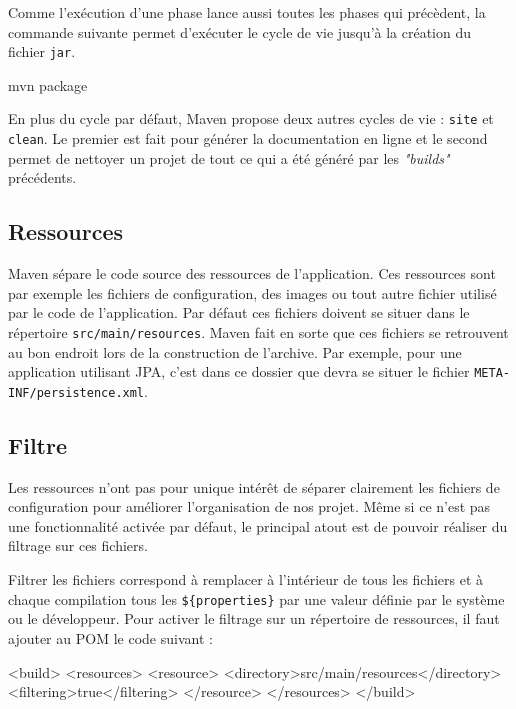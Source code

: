 \documentclass[a4paper,11pt]{article}
\begin{document}
Comme l'exécution d'une phase lance aussi toutes les phases qui précèdent, la commande suivante permet d'exécuter le cycle 
de vie jusqu'à la création du fichier \texttt{jar}.
\begin{code_shell}
mvn package
\end{code_shell}

En plus du cycle par défaut, Maven propose deux autres cycles de vie : \texttt{site} et \texttt{clean}. Le premier est 
fait pour générer la documentation en ligne et le second permet de nettoyer un projet de tout ce qui a été généré par les 
\emph{"builds"} précédents.

\subsection{Ressources}
Maven sépare le code source des ressources de l'application. Ces ressources sont par exemple les fichiers de configuration, 
des images ou tout autre fichier utilisé par le code de l'application. Par défaut ces fichiers doivent se situer dans le 
répertoire \texttt{src/main/resources}. Maven fait en sorte que ces fichiers se retrouvent au bon endroit lors de la 
construction de l'archive. Par exemple, pour une application utilisant JPA, c'est dans ce dossier que devra se situer 
le fichier \texttt{META-INF/persistence.xml}.

\subsection{Filtre}
Les ressources n'ont pas pour unique intérêt de séparer clairement les fichiers de configuration pour améliorer 
l'organisation de nos projet. Même si ce n'est pas une fonctionnalité activée par défaut, le principal atout est 
de pouvoir réaliser du filtrage sur ces fichiers. 

Filtrer les fichiers correspond à remplacer à l'intérieur de tous les fichiers et à chaque compilation tous les 
\texttt{\$\{properties\}} par une valeur définie par le système ou le développeur. Pour activer le filtrage sur un 
répertoire de ressources, il faut ajouter au POM le code suivant : 
\begin{code_xml}
<build>
  <resources>
    <resource>
      <directory>src/main/resources</directory>
      <filtering>true</filtering>
    </resource>
  </resources>
</build>
\end{code_xml}
\end{document}
